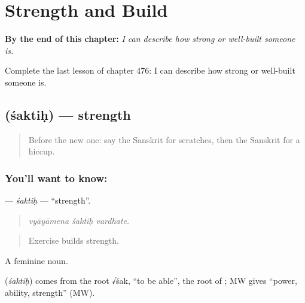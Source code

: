 
\chapter{Strength and Build}
\label{ch:sa-strength-and-build}

\begin{chapteropening}
\textbf{By the end of this chapter:} \emph{I can describe how strong or well-built someone is.}

Complete the last lesson of chapter 476: I can describe how strong or well-built someone is.
\end{chapteropening}

\section[\texorpdfstring{\sk{शक्तिः} (śaktiḥ)}{शक्तिः (śaktiḥ)}]{ (śaktiḥ) — strength}

\label{lesson:SA-C476-saktih}



\begin{quote}
Before the new one: say the Sanskrit for scratches, then the Sanskrit for a hiccup.
\end{quote}

\subsection*{You'll want to know: }
\textbf{} — \emph{śaktiḥ} — \textquotedblleft{}strength\textquotedblright{}.

\begin{quote}
  
\end{quote}

\begin{quote}
\emph{vyāyāmena śaktiḥ vardhate.}
\end{quote}

\begin{quote}
Exercise builds strength.
\end{quote}

A feminine noun.

\begin{cousinweb}
\textbf{} (\emph{śaktiḥ}) comes from the root √śak, \textquotedblleft{}to be able\textquotedblright{}, the root of \textbf{}; MW gives \textquotedblleft{}power, ability, strength\textquotedblright{} (MW).
\end{cousinweb}

